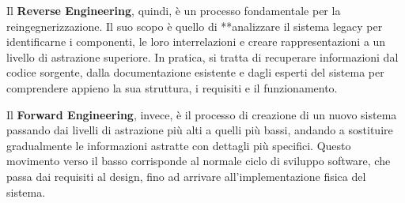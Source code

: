 Il \textbf{Reverse Engineering}, quindi, è un processo fondamentale per la reingegnerizzazione. Il suo scopo è quello di **analizzare il sistema legacy per identificarne i componenti, le loro interrelazioni e creare rappresentazioni a un livello di astrazione superiore. In pratica, si tratta di recuperare informazioni dal codice sorgente, dalla documentazione esistente e dagli esperti del sistema per comprendere appieno la sua struttura, i requisiti e il funzionamento.

Il \textbf{Forward Engineering}, invece, è il processo di creazione di un nuovo sistema passando dai livelli di astrazione più alti a quelli più bassi, andando a sostituire gradualmente le informazioni astratte con dettagli più specifici. Questo movimento verso il basso corrisponde al normale ciclo di sviluppo software, che passa dai requisiti al design, fino ad arrivare all'implementazione fisica del sistema.

